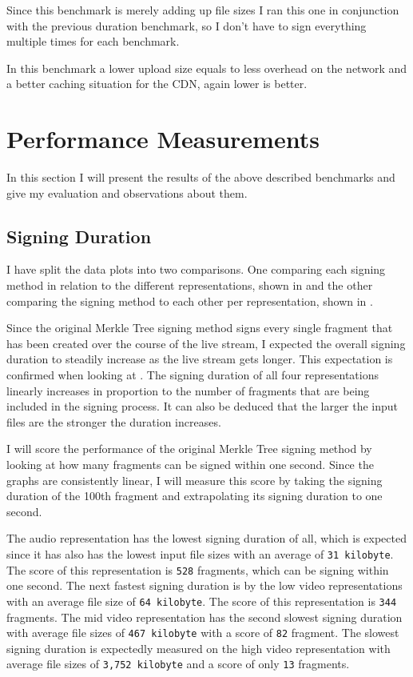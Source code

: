 Since this benchmark is merely adding up file sizes I ran this one in conjunction with the previous duration benchmark, so I don't have to sign everything multiple times for each benchmark.

In this benchmark a lower upload size equals to less overhead on the network and a better caching situation for the CDN, again lower is better.

\section{Performance Measurements\label{sec:performance}}

In this section I will present the results of the above described benchmarks and give my evaluation and observations about them.

\subsection{Signing Duration}

I have split the data plots into two comparisons. One comparing each signing method in relation to the different representations, shown in  and the other comparing the signing method to each other per representation, shown in .

Since the original Merkle Tree signing method signs every single fragment that has been created over the course of the live stream, I expected the overall signing duration to steadily increase as the live stream gets longer. This expectation is confirmed when looking at . The signing duration of all four representations linearly increases in proportion to the number of fragments that are being included in the signing process. It can also be deduced that the larger the input files are the stronger the duration increases. 

I will score the performance of the original Merkle Tree signing method by looking at how many fragments can be signed within one second. Since the graphs are consistently linear, I will measure this score by taking the signing duration of the 100th fragment and extrapolating its signing duration to one second.

The audio representation has the lowest signing duration of all, which is expected since it has also has the lowest input file sizes with an average of \texttt{31 kilobyte}. The score of this representation is \texttt{528} fragments, which can be signing within one second. The next fastest signing duration is by the low video representations with an average file size of \texttt{64 kilobyte}. The score of this representation is \texttt{344} fragments. The mid video representation has the second slowest signing duration with average file sizes of \texttt{467 kilobyte} with a score of \texttt{82} fragment. The slowest signing duration is expectedly measured on the high video representation with average file sizes of \texttt{3,752 kilobyte} and a score of only \texttt{13} fragments.

